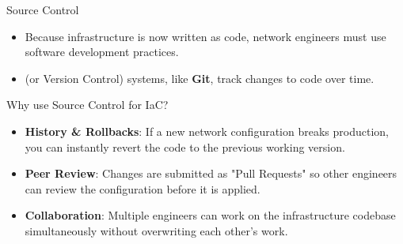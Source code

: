 \documentclass[aspectratio=169]{beamer}  %
\begin{document}
\begin{frame}[t]{Source Control}
    \begin{itemize}
        \item Because infrastructure is now written as code, network engineers must use software development practices.
        \item {} (or Version Control) systems, like \textbf{Git}, track changes to code over time.
    \end{itemize}
    \vspace{0.3em}
    \begin{block}{Why use Source Control for IaC?}
        \footnotesize
        \begin{itemize}
            \item \textbf{History \& Rollbacks}: If a new network configuration breaks production, you can instantly revert the code to the previous working version.
            \item \textbf{Peer Review}: Changes are submitted as "Pull Requests" so other engineers can review the configuration before it is applied.
            \item \textbf{Collaboration}: Multiple engineers can work on the infrastructure codebase simultaneously without overwriting each other's work.
        \end{itemize}
    \end{block}
\end{frame}
\end{document}
